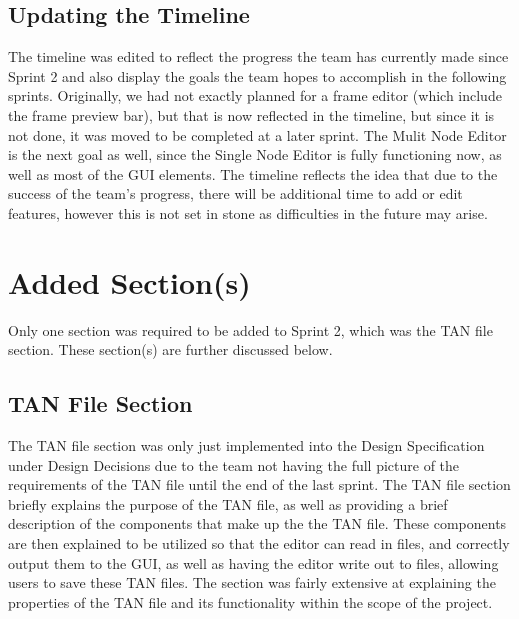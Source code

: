 \documentclass[12pt]{article}
\begin{document}
			\subsection {Updating the Timeline}
			\forceindent The timeline was edited to reflect the progress the team has currently made since Sprint 2 and also display the goals the team hopes to accomplish in the following sprints. Originally, we had not exactly planned for a frame editor (which include the frame preview bar), but that is now reflected in the timeline, but since it is not done, it was moved to be completed at a later sprint. The Mulit Node Editor is the next goal as well, since the Single Node Editor is fully functioning now, as well as most  of the GUI elements. The timeline reflects the idea that due to the success of the team's progress, there will be additional time to add or edit features, however this is not set in stone as difficulties in the future may arise.
			
			\newpage
		
		\section{Added Section(s)}
		\forceindent Only one section was required to be added to Sprint 2, which was the TAN file section. These section(s) are further discussed below.
		
		\subsection {TAN File Section}
		\forceindent The TAN file section was only just implemented into the Design Specification under Design Decisions due to the team not having the full picture of the requirements of the TAN file until the end of the last sprint. The TAN file section briefly explains the purpose of the TAN file, as well as providing a brief description of the components that make up the the TAN file. These components are then explained to be utilized so that the editor can read in files, and correctly output them to the GUI, as well as having the editor write out to files, allowing users to save these TAN files. The section was fairly extensive at explaining the properties of the TAN file and its functionality within the scope of the project.
		
\end{document}
